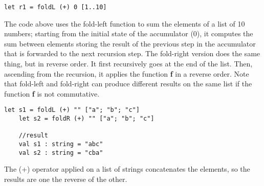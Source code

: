 \begin{lstlisting}[style = FSharpStyle]
    let r1 = foldL (+) 0 [1..10]
\end{lstlisting}
The code above uses the fold-left function to sum the elements of a list of 10 numbers; starting from the initial state of the accumulator (0), it computes the sum between elements storing the result of the previous step in the accumulator that is forwarded to the next recursion step.\newline\newline
The fold-right version does the same thing, but in reverse order. It first recursively goes at the end of the list. Then, ascending from the recursion, it applies the function \textbf{f} in a reverse order.\newline\newline
Note that fold-left and fold-right can produce different results on the same list if the function \textbf{f} is not commutative.
\begin{lstlisting}[style = FSharpStyle]
    let s1 = foldL (+) "" ["a"; "b"; "c"]
    let s2 = foldR (+) "" ["a"; "b"; "c"]

    //result
    val s1 : string = "abc"
    val s2 : string = "cba"
\end{lstlisting}
The (+) operator applied on a list of strings concatenates the elements, so the results are one the reverse of the other.
